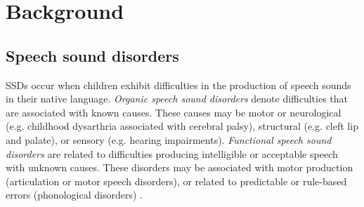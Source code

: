 \section{Background}
\label{sec:background}

\subsection{Speech sound disorders}
SSDs occur when children exhibit difficulties in the production of speech sounds in their native language.
\emph{Organic speech sound disorders} denote difficulties that are associated with known causes.
These causes may be motor or neurological (e.g. childhood dysarthria associated with cerebral palsy), structural (e.g. cleft lip and palate), or sensory (e.g. hearing impairments).
\emph{Functional speech sound disorders} are related to difficulties producing intelligible or acceptable speech with unknown causes.
These disorders may be associated with motor production (articulation or motor speech disorders), or related to predictable or rule-based errors (phonological disorders) \citep{asha2020}.


\begin{table}[t]
\centering
{}
\caption{Selected examples of substitutions. A phone or group of phones is systematically replaced by another phone or group of phones.}
\label{tab:background-substitutions}
\end{table}


